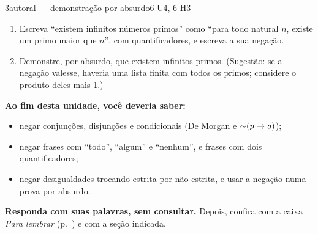\begin{questao}{3}{autoral — demonstração por absurdo}{6-U4, 6-H3}\label{u6:q14}
\begin{enumerate}[label=\alph*)]
  \item Escreva \enquote{existem infinitos números primos} como \enquote{para todo natural $n$, existe um primo maior que $n$}, com quantificadores, e escreva a sua negação.
  \item Demonstre, por absurdo, que existem infinitos primos. (Sugestão: se a negação valesse, haveria uma lista finita com todos os primos; considere o produto deles mais 1.)
\end{enumerate}
\end{questao}

\begin{sintese}
\textbf{Ao fim desta unidade, você deveria saber:}
\begin{itemize}[leftmargin=1.4em,itemsep=1pt]
  \item negar conjunções, disjunções e condicionais (De Morgan e ${{\sim}}(p\rightarrow q)$);
  \item negar frases com \enquote{todo}, \enquote{algum} e \enquote{nenhum}, e frases com dois quantificadores;
  \item negar desigualdades trocando estrita por não estrita, e usar a negação numa prova por absurdo.
\end{itemize}
\smallskip\noindent\textbf{Responda com suas palavras, sem consultar.} Depois, confira com a caixa \emph{Para lembrar} (p.~\pageref{lembrar-u6}) e com a seção indicada.
\begin{enumerate}[label=\arabic*.,leftmargin=1.4em]
\end{enumerate}
\end{sintese}

\Respostas
{\small
{}
}
